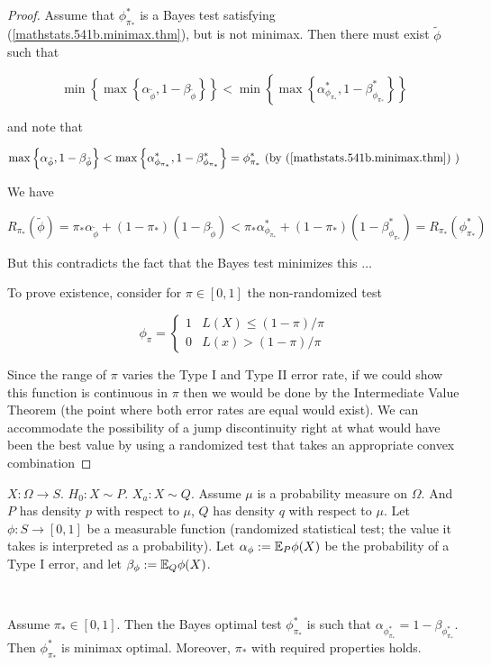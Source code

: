 \begin{proof}

Assume that \(\phi_{\pi_*}^*\) is a Bayes test satisfying (\ref{mathstats.541b.minimax.thm}), but is not minimax. Then there must exist \(\tilde{\phi}\) such that 

\[
\min \left\{  \max \left\{\alpha_{\tilde{\phi}} , 1 - \beta_{\tilde{\phi}} \right\} \right\}
< 
\min \left\{  \max \left\{\alpha_{\phi_{\pi_*}}^* , 1 - \beta_{\phi_{\pi_*}}^* \right\} \right\} 
\]

and note that 

\[
  \max \left\{\alpha_{\tilde{\phi}} , 1 - \beta_{\tilde{\phi}} \right\} 
< 
  \max \left\{\alpha_{\phi_{\pi_*}}^* , 1 - \beta_{\phi_{\pi_*}}^* \right\}  = \phi_{\pi_*}^*
 \text{ (by (\ref{mathstats.541b.minimax.thm}) )}
\]

We have

\[
R_{\pi_*}(\tilde{\phi}) = \pi_* \alpha_{\tilde{\phi}} + (1 - \pi_*)(1 - \beta_{\tilde{\phi}}) < \pi_* \alpha_{\phi_{\pi_*}}^*+ (1 - \pi_*)( 1 - \beta_{\phi_{\pi_*}}^*) = R_{\pi_*}(\phi_{\pi_*}^*)
\]

But this contradicts the fact that the Bayes test minimizes this \(\ldots\)

To prove existence, consider for \(\pi \in [0,1]\) the non-randomized test

\[
\phi_\pi = \begin{cases}
1 & L(X) \leq (1-\pi)/\pi \\
0 & L(x) > (1 - \pi)/\pi
\end{cases}
\]

Since the range of \(\pi\) varies the Type I and Type II error rate, if we could show this function is continuous in \(\pi\) then we would be done by the Intermediate Value Theorem (the point where both error rates are equal would exist). We can accommodate the possibility of a jump discontinuity right at what would have been the best value by using a randomized test that takes an appropriate convex combination

\end{proof}



\begin{theorem}

\(X: \Omega \to S\). \(H_0: X \sim P\). \(X_a: X \sim Q\). Assume \(\mu\) is a probability measure on \(\Omega\). And \(P\) has density \(p\) with respect to \(\mu\), \(Q\) has density \(q\) with respect to \(\mu\). Let \(\phi: S \to [0,1]\) be a measurable function (randomized statistical test; the value it takes is interpreted as a probability). Let \(\alpha_\phi:= \E_P \phi(X)\) be the probability of a Type I error, and let \(\beta_\phi := \E_Q \phi(X)\). 

\

Assume \(\pi_* \in [0,1]\). Then the Bayes optimal test \(\phi_{\pi_*}^*\) is such that \(\alpha_ {\phi_{\pi_*}^*} = 1 - \beta_{\phi_{\pi_*}^*} \). Then \(\phi_{\pi_*}^*\) is minimax optimal. Moreover, \(\pi_*\) with required properties holds. 

\end{theorem}

